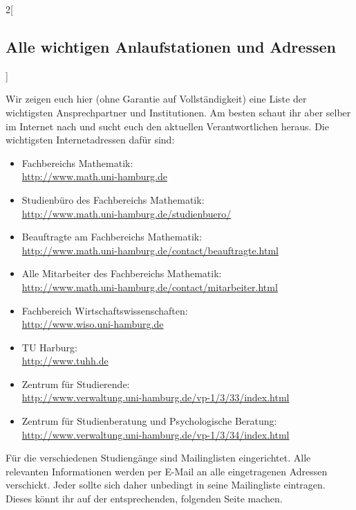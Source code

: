 \begin{multicols}{2}[\subsection{Alle wichtigen Anlaufstationen und Adressen}]

Wir zeigen euch hier (ohne Garantie auf Vollständigkeit) eine Liste der
wichtigsten Ansprechpartner und Institutionen. Am besten schaut ihr aber selber
im Internet nach und sucht euch den aktuellen Verantwortlichen heraus. Die
wichtigsten Internetadressen dafür sind:

\begin{itemize}\itemsep 0pt
    \item Fachbereichs Mathematik:\\
          \url{http://www.math.uni-hamburg.de}
    \item Studienbüro des Fachbereichs Mathematik:\\
          \url{http://www.math.uni-hamburg.de/studienbuero/}
    \item Beauftragte am Fachbereichs Mathematik:\\
          \url{http://www.math.uni-hamburg.de/contact/beauftragte.html}
    \item Alle Mitarbeiter des Fachbereichs Mathematik:\\
          \url{http://www.math.uni-hamburg.de/contact/mitarbeiter.html}
    \item Fachbereich Wirtschaftswissenschaften:\\
          \url{http://www.wiso.uni-hamburg.de}
    \item TU Harburg:\\
          \url{http://www.tuhh.de}
    \item Zentrum für Studierende:\\
          \url{http://www.verwaltung.uni-hamburg.de/vp-1/3/33/index.html}
    \item Zentrum für Studienberatung und Psychologische Beratung:\\
          \url{http://www.verwaltung.uni-hamburg.de/vp-1/3/34/index.html}
\end{itemize}

Für die verschiedenen Studiengänge sind Mailinglisten eingerichtet. Alle
relevanten Informationen werden per E-Mail an alle eingetragenen Adressen
verschickt. Jeder sollte sich daher unbedingt in seine Mailingliste eintragen.
Dieses könnt ihr auf der entsprechenden, folgenden Seite machen.


\end{multicols}
